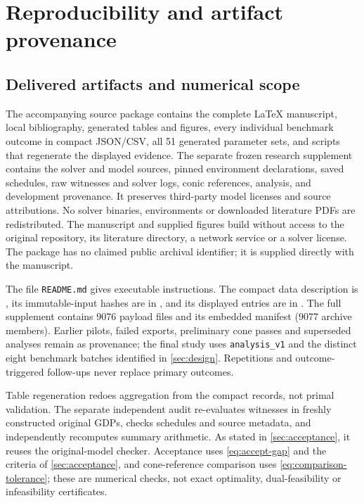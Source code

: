 \section{Reproducibility and artifact provenance}\label{app:reproducibility}
\subsection{Delivered artifacts and numerical scope}
The accompanying source package contains the complete LaTeX manuscript, local bibliography, generated tables and figures, every individual benchmark outcome in compact JSON/CSV, all 51 generated parameter sets, and scripts that regenerate the displayed evidence. The separate frozen research supplement contains the solver and model sources, pinned environment declarations, saved schedules, raw witnesses and solver logs, conic references, analysis, and development provenance. It preserves third-party model licenses and source attributions. No solver binaries, environments or downloaded literature PDFs are redistributed. The manuscript and supplied figures build without access to the original repository, its literature directory, a network service or a solver license. The package has no claimed public archival identifier; it is supplied directly with the manuscript.

The file \texttt{README.md} gives executable instructions. The compact data description is , its immutable-input hashes are in , and its displayed entries are in . The full supplement contains 9076 payload files and its embedded manifest (9077 archive members). Earlier pilots, failed exports, preliminary cone passes and superseded analyses remain as provenance; the final study uses \texttt{analysis\_v1} and the distinct eight benchmark batches identified in \cref{sec:design}. Repetitions and outcome-triggered follow-ups never replace primary outcomes.

Table regeneration redoes aggregation from the compact records, not primal validation. The separate independent audit re-evaluates witnesses in freshly constructed original GDPs, checks schedules and source metadata, and independently recomputes summary arithmetic. As stated in \cref{sec:acceptance}, it reuses the original-model checker. Acceptance uses \eqref{eq:accept-gap} and the criteria of \cref{sec:acceptance}, and cone-reference comparison uses \eqref{eq:comparison-tolerance}; these are numerical checks, not exact optimality, dual-feasibility or infeasibility certificates.

